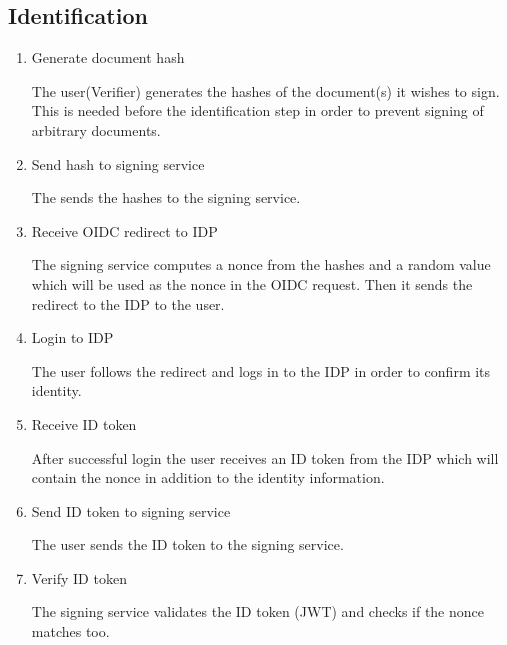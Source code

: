 \subsection{Identification}
\begin{enumerate}[resume]
	\item Generate document hash
	
	The user(Verifier) generates the hashes of the document(s) it wishes to sign.
	This is needed before the identification step in order to prevent signing of arbitrary documents.
	
	\item Send hash to signing service
	
	The sends the hashes to the signing service.
	
	\item Receive \gls{OIDC} redirect to \gls{IDP}
	
	The signing service computes a nonce from the hashes and a random value which will be used as the nonce in the \gls{OIDC} request.
	Then it sends the redirect to the \gls{IDP} to the user.
	
	\item Login to \gls{IDP}
	
	The user follows the redirect and logs in to the \gls{IDP} in order to confirm its identity.
	
	\item Receive ID token
	
	After successful login the user receives an ID token from the \gls{IDP} which will contain the nonce in addition to the identity information.
	
	\item Send ID token to signing service
	
	The user sends the ID token to the signing service.
	
	\item Verify ID token
	
	The signing service validates the ID token (\gls{JWT}) and checks if the nonce matches too.
\end{enumerate}

	

